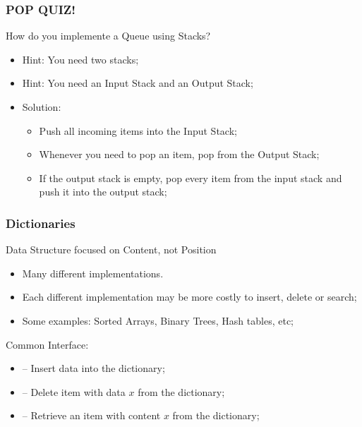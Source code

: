 \begin{frame}
  \frametitle{POP QUIZ!}
  \begin{block}{How do you implemente a Queue using Stacks?}
    \begin{itemize}
      \item<2->Hint: You need two stacks;
        \bigskip 

      \item<3->Hint: You need an Input Stack and an Output Stack;
        \bigskip

      \item<4>Solution:
        \begin{itemize}
        \item<4> Push all incoming items into the Input Stack;
        \item<4> Whenever you need to pop an item, pop from the Output Stack;
        \item<4> If the output stack is empty, pop every item from the
          input stack and push it into the output stack;
        \end{itemize}
    \end{itemize}
  \end{block}
\end{frame}

\begin{frame}
  \frametitle{Dictionaries}
  \begin{center}
    Data Structure focused on Content, not Position
  \end{center}
  \begin{itemize}
    \item Many different implementations. 
    \item Each different implementation may be more costly to insert,
      delete or search;
    \item Some examples: Sorted Arrays, Binary Trees, Hash tables, etc;
  \end{itemize}
  \begin{block}{Common Interface:}
    \begin{itemize}
    \item {} -- Insert data into the dictionary;
    \item {} -- Delete item with data $x$ from the
      dictionary;
    \item {} -- Retrieve an item with content $x$
      from the dictionary;
    \end{itemize}
  \end{block}
\end{frame}

